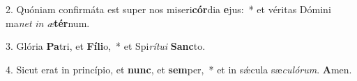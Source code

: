 2. Quóniam confirmáta est super nos miseri\textbf{cór}dia \textbf{e}jus:~*  et véritas Dómini ma\textit{net} \textit{in} \textit{æ}\textbf{tér}num.\

3. Glória \textbf{Pa}tri, et \textbf{Fí}\textbf{li}o,~*  et Spi\textit{rí}\textit{tu}\textit{i} \textbf{Sanc}to.\

4. Sicut erat in princípio, et \textbf{nunc}, et \textbf{sem}per,~*  et in sǽcula sæ\textit{cu}\textit{ló}\textit{rum}. \textbf{A}men.\


